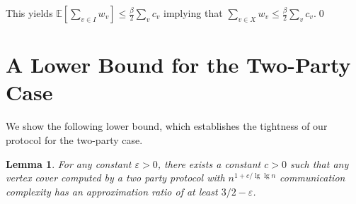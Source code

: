\documentclass[11pt]{article}
\newtheorem{lemma}[theorem]{Lemma}
\newcommand{\E}[0]{\ensuremath{\mathbb{E}}}
\begin{document}
    This yields ${\E}[\sum_{v \in I} w_v] \le \frac{\beta}{2} \sum_{v} c_v$
    implying that $\sum_{v \in X} w_v \le \frac{\beta}{2} \sum_{v}
    c_v$.\qed





  \newcommand{\eps}{\varepsilon}
\section{A Lower Bound for the Two-Party Case}
\label{sec:lower bound}
We show the following lower bound, which establishes the tightness of our protocol for the two-party case.  
\begin{lemma}
\label{lemma:lower-bound}
For any constant
$\eps > 0$, there exists a constant $c > 0$ such that any vertex cover
computed by a two party protocol with $n^{1 + c/\lg\lg n}$ communication complexity
has an approximation ratio of at least $3/2 - \eps$.
\end{lemma}
\end{document}
